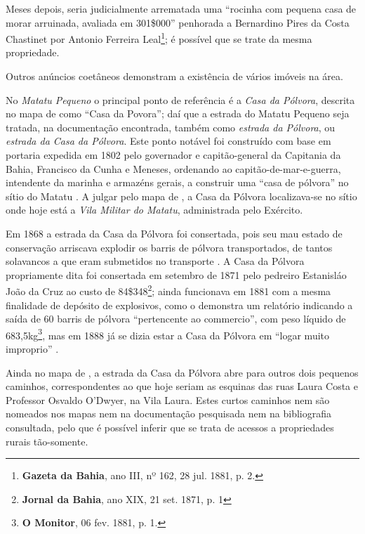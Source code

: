 Meses depois, seria judicialmente arrematada uma ``rocinha com pequena casa de morar arruinada, avaliada em 301\$000'' penhorada a Bernardino Pires da Costa Chastinet por Antonio Ferreira Leal\footnote{\textbf{Gazeta da Bahia}, ano III, nº 162, 28 jul. 1881, p. 2.}; é possível que se trate da mesma propriedade. 

Outros anúncios coetâneos demonstram a existência de vários imóveis na área.

No \textit{Matatu Pequeno} o principal ponto de referência é a \textit{Casa da Pólvora}, descrita no mapa de  como ``Casa da Povora''; daí que a estrada do Matatu Pequeno seja tratada, na documentação encontrada, também como \textit{estrada da Pólvora}, ou \textit{estrada da Casa da Pólvora}. Este ponto notável foi construído com base em portaria expedida em 1802 pelo governador e capitão-general da Capitania da Bahia, Francisco da Cunha e Meneses, ordenando ao capitão-de-mar-e-guerra, intendente da marinha e armazéns gerais, a construir uma ``casa de pólvora'' no sítio do Matatu \cite[p.~93]{oliveira_ultramar_1977}. A julgar pelo mapa de , a Casa da Pólvora localizava-se no sítio onde hoje está a \textit{Vila Militar do Matatu}, administrada pelo Exército. 

Em 1868 a estrada da Casa da Pólvora foi consertada, pois seu mau estado de conservação arriscava explodir os barris de pólvora transportados, de tantos solavancos a que eram submetidos no transporte \cite[anexo~G,~p.~9]{bahia_anexosrelatorio_1868}. A Casa da Pólvora propriamente dita foi consertada em setembro de 1871 pelo pedreiro Estanisláo João da Cruz ao custo de 84\$348\footnote{\textbf{Jornal da Bahia}, ano XIX, 21 set. 1871, p. 1}; ainda funcionava em 1881 com a mesma finalidade de depósito de explosivos, como o demonstra um relatório indicando a saída de 60 barris de pólvora ``pertencente ao commercio'', com peso líquido de 683,5kg\footnote{\textbf{O Monitor}, 06 fev. 1881, p. 1.}, mas em 1888 já se dizia estar a Casa da Pólvora em ``logar muito improprio'' \cite[vol.~3,~p.~40]{bahia_relatorio_1888}. 

Ainda no mapa de , a estrada da Casa da Pólvora abre para outros dois pequenos caminhos, correspondentes ao que hoje seriam as esquinas das ruas Laura Costa e Professor Osvaldo O'Dwyer, na Vila Laura. Estes curtos caminhos nem são nomeados nos mapas nem na documentação pesquisada nem na bibliografia consultada, pelo que é possível inferir que se trata de acessos a propriedades rurais tão-somente.

